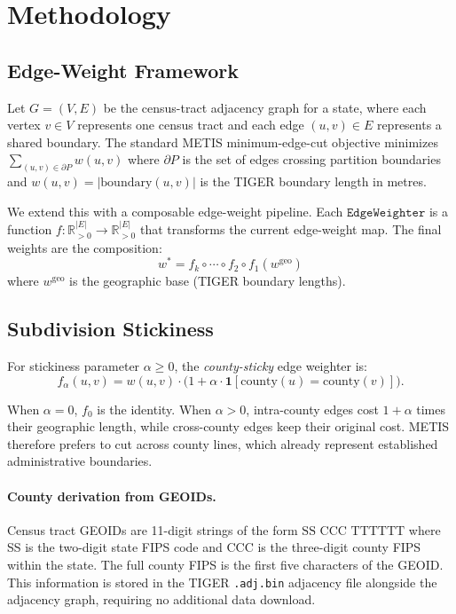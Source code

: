 \section{Methodology}
\label{sec:method}

\subsection{Edge-Weight Framework}

Let $G = (V, E)$ be the census-tract adjacency graph for a state,
where each vertex $v \in V$ represents one census tract and each edge
$(u,v) \in E$ represents a shared boundary.
The standard METIS minimum-edge-cut objective minimizes
$\sum_{(u,v) \in \partial P} w(u,v)$
where $\partial P$ is the set of edges crossing partition boundaries and
$w(u,v) = |\text{boundary}(u,v)|$ is the TIGER boundary length in metres.

We extend this with a composable edge-weight pipeline.
Each $\mathtt{EdgeWeighter}$ is a function $f : \mathbb{R}_{>0}^{|E|} \to \mathbb{R}_{>0}^{|E|}$
that transforms the current edge-weight map.
The final weights are the composition:
\[
  w^* = f_k \circ \cdots \circ f_2 \circ f_1(w^{\text{geo}})
\]
where $w^{\text{geo}}$ is the geographic base (TIGER boundary lengths).

\subsection{Subdivision Stickiness}

\begin{definition}
For stickiness parameter $\alpha \geq 0$, the \emph{county-sticky} edge weighter is:
\[
  f_\alpha(u,v) = w(u,v) \cdot \bigl(1 + \alpha \cdot \mathbf{1}[\text{county}(u) = \text{county}(v)]\bigr).
\]
\end{definition}

When $\alpha = 0$, $f_0$ is the identity.
When $\alpha > 0$, intra-county edges cost $1 + \alpha$ times their geographic length,
while cross-county edges keep their original cost.
METIS therefore prefers to cut across county lines, which already represent
established administrative boundaries.

\paragraph{County derivation from GEOIDs.}
Census tract GEOIDs are 11-digit strings of the form $\text{SS CCC TTTTTT}$
where SS is the two-digit state FIPS code and CCC is the three-digit county FIPS
within the state.
The full county FIPS is the first five characters of the GEOID.
This information is stored in the TIGER \texttt{.adj.bin} adjacency file alongside
the adjacency graph, requiring no additional data download.

